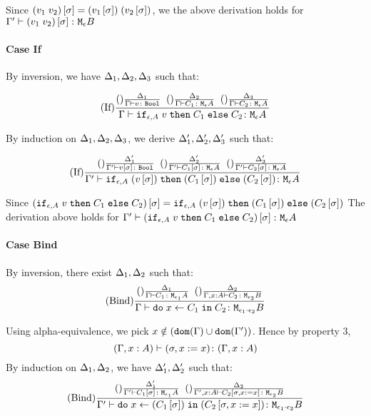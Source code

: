 \documentclass{report}
\begin{document}
    Since $(v_1\; v_2)\left[\sigma\right] = (v_1\left[\sigma\right])\;(v_2\left[\sigma\right])$, we the above derivation holds for $\Gamma' \vdash (v_1\; v_2)\left[\sigma\right] \colon \texttt{M}_{\epsilon}{B}$
\paragraph{Case If}
    By inversion, we have $\Delta_1,\Delta_2,\Delta_3$ such that:

    \begin{equation}
        (\text{If}) \frac{
            (\text{}) \frac{\Delta_1}{\Gamma \vdash v \colon \texttt{Bool}}
            \;\;
            (\text{}) \frac{\Delta_2}{\Gamma \vdash C_1 \colon \texttt{M}_{\epsilon}{A}}
            \;\;
            (\text{}) \frac{\Delta_3}{\Gamma \vdash C_2 \colon \texttt{M}_{\epsilon}{A}}
        }{
            \Gamma \vdash \texttt{if}_{\epsilon, A}\; v\; \texttt{then}\; C_1 \;\texttt{else} \; C_2 \colon \texttt{M}_{\epsilon}{A}
        }
    \end{equation}

    By induction on $\Delta_1,\Delta_2, \Delta_3$, we derive 
    $\Delta_1', \Delta_2',\Delta_3'$ such that:
    
    \begin{equation}
        (\text{If}) \frac{
            (\text{}) \frac{\Delta_1'}{\Gamma' \vdash v\left[\sigma\right] \colon \texttt{Bool}}
            \;\;
            (\text{}) \frac{\Delta_2'}{\Gamma' \vdash C_1\left[\sigma\right] \colon \texttt{M}_{\epsilon}{A}}
            \;\;
            (\text{}) \frac{\Delta_3'}{\Gamma' \vdash C_2\left[\sigma\right] \colon \texttt{M}_{\epsilon}{A}}
        }{
            \Gamma' \vdash \texttt{if}_{\epsilon, A}\;(v\left[\sigma\right])\; \texttt{then}\; (C_1\left[\sigma\right]) \;\texttt{else} \;(C_2\left[\sigma\right]) \colon \texttt{M}_{\epsilon}{A}
        }
    \end{equation}

    Since $(\texttt{if}_{\epsilon, A}\; v\; \texttt{then}\; C_1 \;\texttt{else} \; C_2)\left[\sigma\right] = \texttt{if}_{\epsilon, A}\;(v\left[\sigma\right])\; \texttt{then}\; (C_1\left[\sigma\right]) \;\texttt{else} \;(C_2\left[\sigma\right])$ The derivation above holds for $\Gamma' \vdash (\texttt{if}_{\epsilon, A}\; v\; \texttt{then}\; C_1 \;\texttt{else} \; C_2)\left[\sigma\right] \colon \texttt{M}_{\epsilon}{A}$

\paragraph{Case Bind}
    By inversion, there exist $\Delta_1, \Delta_2$ such that:
    \begin{equation}
        (\text{Bind}) \frac{
            (\text{}) \frac{\Delta_1}{\Gamma \vdash C_1 \colon \texttt{M}_{\epsilon_1}{A}}
            \;\;
            (\text{}) \frac{\Delta_2}{\Gamma, x:A \vdash C_2 \colon \texttt{M}_{\epsilon_2}{B}}
        }{\Gamma \vdash \texttt{do}\; x \leftarrow C_1 \;\texttt{in}\; C_2 \colon \texttt{M}_{\epsilon_1\cdot\epsilon_2}{B}}
    \end{equation}

    Using alpha-equivalence, we pick $x\notin(\texttt{dom}(\Gamma)\cup\texttt{dom}(\Gamma'))$. Hence by property 3, $$(\Gamma, x: A) \vdash (\sigma, x:= x) \colon (\Gamma, x: A)$$
    By induction on $\Delta_1, \Delta_2$, we have $\Delta_1', \Delta_2'$ such that:
    \begin{equation}
        (\text{Bind}) \frac{
            (\text{}) \frac{\Delta_1'}{\Gamma' \vdash C_1\left[\sigma\right] \colon \texttt{M}_{\epsilon_1}{A}}
            \;\;
            (\text{}) \frac{\Delta_2}{\Gamma', x:A \vdash C_2\left[\sigma, x:= x\right] \colon \texttt{M}_{\epsilon_2}{B}}
        }{\Gamma' \vdash \texttt{do}\; x \leftarrow (C_1\left[\sigma\right]) \;\texttt{in}\; (C_2\left[\sigma, x:= x\right]) \colon \texttt{M}_{\epsilon_1\cdot\epsilon_2}{B}}
    \end{equation}
\end{document}
